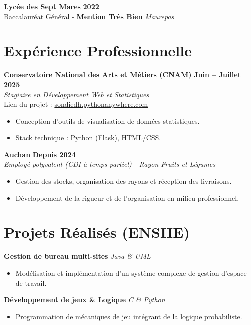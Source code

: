\documentclass[10pt, a4paper]{article}
\begin{document}
\vspace{4pt}
\textbf{Lycée des Sept Mares} \hfill \textbf{2022} \\
Baccalauréat Général - \textbf{Mention Très Bien} \hfill \textit{Maurepas}

\section{Expérience Professionnelle}

\textbf{Conservatoire National des Arts et Métiers (CNAM)} \hfill \textbf{Juin -- Juillet 2025} \\
\textit{Stagiaire en Développement Web et Statistiques} \\
Lien du projet : \href{https://sondiedh.pythonanywhere.com}{sondiedh.pythonanywhere.com}
\begin{itemize}
    \item Conception d'outils de visualisation de données statistiques.
    \item Stack technique : Python (Flask), HTML/CSS.
\end{itemize}

\vspace{6pt}

\textbf{Auchan} \hfill \textbf{Depuis 2024} \\
\textit{Employé polyvalent (CDI à temps partiel) - Rayon Fruits et Légumes}
\begin{itemize}
    \item Gestion des stocks, organisation des rayons et réception des livraisons.
    \item Développement de la rigueur et de l'organisation en milieu professionnel.
\end{itemize}

\section{Projets Réalisés (ENSIIE)}

\textbf{Gestion de bureau multi-sites} \hfill \textit{Java \& UML}
\begin{itemize}
    \item Modélisation et implémentation d'un système complexe de gestion d'espace de travail.
\end{itemize}

\vspace{6pt}

\textbf{Développement de jeux \& Logique} \hfill \textit{C \& Python}
\begin{itemize}
    \item Programmation de mécaniques de jeu intégrant de la logique probabiliste.
\end{itemize}
\end{document}
